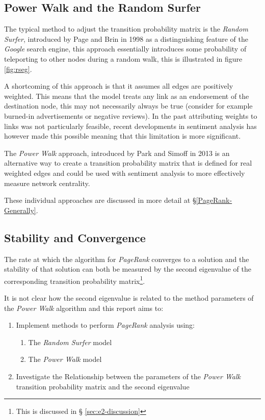 \documentclass[11pt, twoside]{report}
\begin{document}
\subsection{Power Walk and the Random Surfer}
\label{sec:org109f9e7}
The typical method to adjust the transition probability matrix is the \emph{Random
Surfer}, introduced by Page and Brin in 1998
 \cite{larrypageAnatomyLargescaleHypertextual1998} as a distinguishing feature of
the \emph{Google} search engine, this approach essentially introduces some probability
of teleporting to other nodes during a random walk, this is illustrated in
figure \ref{fig:rseg}.

A shortcoming of this approach is that it assumes all edges are positively weighted. This
means that the model treats any link as an endorsement of the destination
node, this may not necessarily always be true (consider for example burned-in
advertisements or negative reviews). In the past attributing weights to links was not particularly feasible, recent developments in sentiment analysis has however made this possible meaning that this limitation is more significant.

The \emph{Power Walk} approach, introduced by Park and Simoff in 2013 \cite{parkPowerWalkRevisiting2013} is an alternative way to create a transition
probability matrix that is defined for real weighted edges and could be used with sentiment analysis to more effectively measure network centrality.

These individual approaches are discussed in more detail at \S \ref{PageRank-Generally}.

\subsection{Stability and Convergence}
\label{sec:orgcefa601}

The rate at which the algorithm for \emph{PageRank} converges to a solution and
the stability of that solution can both be measured by the second eigenvalue of
the corresponding transition probability matrix\footnote{This is discussed in \S
  \ref{sec:e2-discussion}}.

It is not clear how the second eigenvalue is related to the method parameters of the \emph{Power Walk} algorithm \cite[]{parkPowerWalkRevisiting2013} and this report aims to:

\begin{enumerate}
\item Implement methods to perform \emph{PageRank} analysis using:
\begin{enumerate}
\item The \emph{Random Surfer} model
\item The \emph{Power Walk} model
\end{enumerate}
\item Investigate the Relationship between the parameters of the \emph{Power Walk}
transition probability matrix and the second eigenvalue
\end{enumerate}
\end{document}

